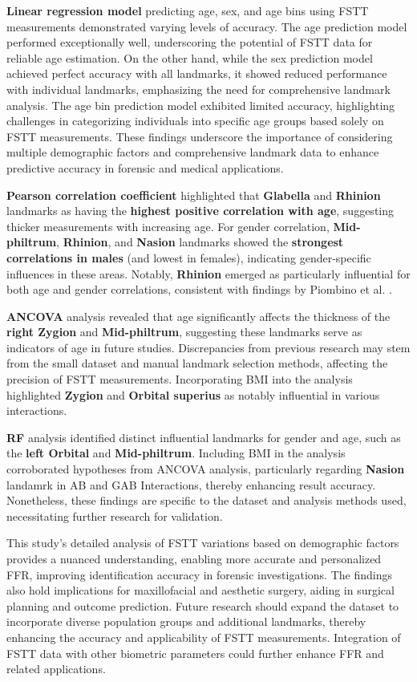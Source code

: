 \documentclass[journal,article,submit,pdftex,moreauthors]{Definitions/mdpi}
\begin{document}
\textbf{Linear regression model} predicting age, sex, and age bins using FSTT measurements demonstrated varying levels of accuracy. The age prediction model performed exceptionally well, underscoring the potential of FSTT data for reliable age estimation. On the other hand, while the sex prediction model achieved perfect accuracy with all landmarks, it showed reduced performance with individual landmarks, emphasizing the need for comprehensive landmark analysis. The age bin prediction model exhibited limited accuracy, highlighting challenges in categorizing individuals into specific age groups based solely on FSTT measurements. These findings underscore the importance of considering multiple demographic factors and comprehensive landmark data to enhance predictive accuracy in forensic and medical applications.

\textbf{Pearson correlation coefficient} highlighted that \textbf{Glabella} and \textbf{Rhinion} landmarks as having the \textbf{highest positive correlation with age}, suggesting thicker measurements with increasing age. For gender correlation, \textbf{Mid-philtrum}, \textbf{Rhinion}, and \textbf{Nasion} landmarks showed the \textbf{strongest correlations in males} (and lowest in females), indicating gender-specific influences in these areas. Notably, \textbf{Rhinion} emerged as particularly influential for both age and gender correlations, consistent with findings by Piombino et al. \cite{ref19}.

\textbf{ANCOVA} analysis revealed that age significantly affects the thickness of the \textbf{right Zygion} and \textbf{Mid-philtrum}, suggesting these landmarks serve as indicators of age in future studies. Discrepancies from previous research may stem from the small dataset and manual landmark selection methods, affecting the precision of FSTT measurements. Incorporating BMI into the analysis highlighted \textbf{Zygion} and \textbf{Orbital superius} as notably influential in various interactions.

\textbf{RF} analysis identified distinct influential landmarks for gender and age, such as the \textbf{left Orbital} and \textbf{Mid-philtrum}. Including BMI in the analysis corroborated hypotheses from ANCOVA analysis, particularly regarding \textbf{Nasion} landamrk in AB and GAB Interactions, thereby enhancing result accuracy. Nonetheless, these findings are specific to the dataset and analysis methods used, necessitating further research for validation.

This study's detailed analysis of FSTT variations based on demographic factors provides a nuanced understanding, enabling more accurate and personalized FFR, improving identification accuracy in forensic investigations. The findings also hold implications for maxillofacial and aesthetic surgery, aiding in surgical planning and outcome prediction. Future research should expand the dataset to incorporate diverse population groups and additional landmarks, thereby enhancing the accuracy and applicability of FSTT measurements. Integration of FSTT data with other biometric parameters could further enhance FFR and related applications.
\end{document}
